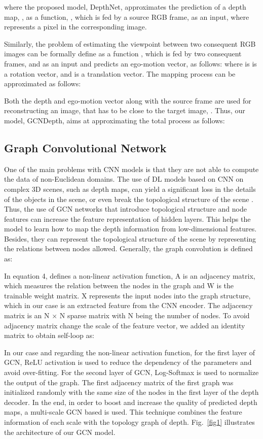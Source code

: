 \documentclass[journal]{IEEEtran}
\begin{document}
where the proposed model, DepthNet, approximates the prediction of a depth map, , as a function, , which is fed by a source RGB frame,  as an input, where  represents a pixel in the corresponding image. 

Similarly, the problem of estimating the viewpoint between two consequent RGB images can be formally define as a function , which is fed by two consequent frames,  and  as an input and predicts an ego-motion vector, as follows:
 where  is is a rotation vector, and  is a translation vector. The mapping process can be approximated as follows:



Both the depth and ego-motion vector along with the  source frame are used for reconstructing an image,  that has to be close to the target image, . Thus, our model, GCNDepth, aims at approximating the total process as follows:



\subsection{Graph Convolutional Network}
One of the main problems with CNN models is that they are not able to compute the data of non-Euclidean domains. The use of DL models based on CNN on complex 3D scenes, such as depth maps, can yield a significant loss in the details of the objects in the scene, or even break the topological structure of the scene \cite{Bronstein}. Thus, the use of GCN networks that introduce topological structure and node features can increase the feature representation of hidden layers. This helps the model to learn how to map the depth information from low-dimensional features. Besides, they can represent the topological structure of the scene by representing the relations between nodes allowed. 
Generally, the graph convolution is defined as: 

In equation 4,  defines a non-linear activation function, A is an adjacency matrix, which measures the relation between the nodes in the graph and W is the trainable weight matrix. X represents the input nodes into the graph structure, which in our case is an extracted feature from the CNN encoder. The adjacency matrix is an N × N sparse matrix with N being the number of nodes. To avoid adjacency matrix change the scale of the feature vector, we added an identity matrix to obtain self-loop as:

In our case and regarding the non-linear activation function, for the first layer of GCN, ReLU activation is used to reduce the dependency of the parameters and avoid over-fitting. For the second layer of GCN, Log-Softmax is used to normalize the output of the graph. The first adjacency matrix of the first graph was initialized randomly with the same size of the nodes in the first layer of the depth decoder. 
In the end, in order to boost and increase the quality of predicted depth maps, a multi-scale GCN based is used. This technique combines the feature information of each scale with the topology graph of depth. Fig.~\ref{fig1} illustrates the architecture of our GCN model.
\end{document}
